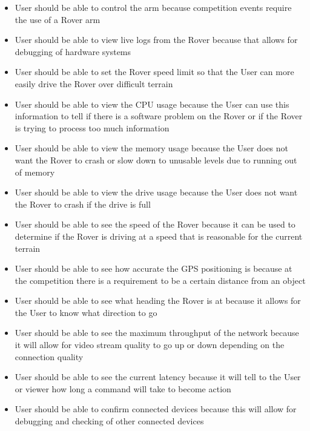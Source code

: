 \documentclass[onecolumn, draftclsnofoot, 10pt, compsoc]{IEEEtran}
\begin{document}
\begin{itemize}
\item User should be able to control the arm because competition events require the use of a Rover arm
\item User should be able to view live logs from the Rover because that allows for debugging of hardware systems
\item User should be able to set the Rover speed limit so that the User can more easily drive the Rover over difficult terrain
\item User should be able to view the CPU usage because the User can use this information to tell if there is a software problem on the Rover or if the Rover is trying to process too much information
\item User should be able to view the memory usage because the User does not want the Rover to crash or slow down to unusable levels due to running out of memory
\item User should be able to view the drive usage because the User does not want the Rover to crash if the drive is full
\item User should be able to see the speed of the Rover because it can be used to determine if the Rover is driving at a speed that is reasonable for the current terrain
\item User should be able to see how accurate the GPS positioning is because at the competition there is a requirement to be a certain distance from an object
\item User should be able to see what heading the Rover is at because it allows for the User to know what direction to go
\item User should be able to see the maximum throughput of the network because it will allow for video stream quality to go up or down depending on the connection quality
\item User should be able to see the current latency because it will tell to the User or viewer how long a command will take to become action
\item User should be able to confirm connected devices because this will allow for debugging and checking of other connected devices
\end{itemize}
\end{document}
